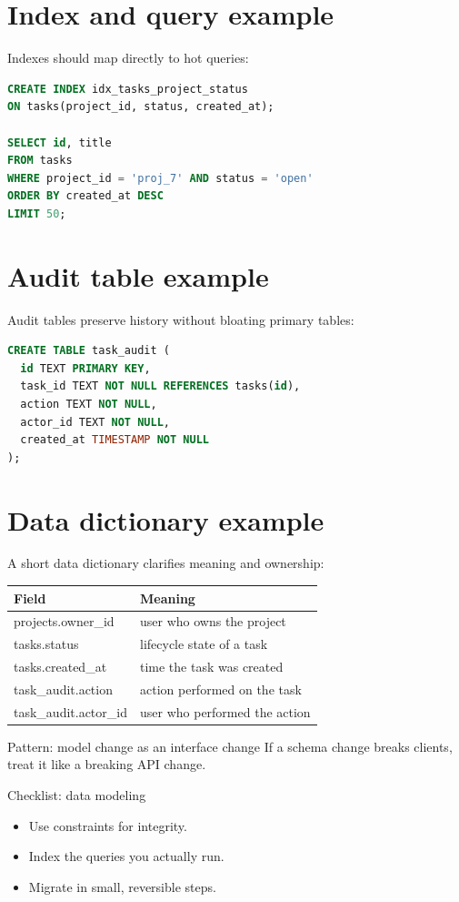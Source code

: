 \section{Index and query example}
Indexes should map directly to hot queries:
\begin{lstlisting}[language=SQL]
CREATE INDEX idx_tasks_project_status
ON tasks(project_id, status, created_at);

SELECT id, title
FROM tasks
WHERE project_id = 'proj_7' AND status = 'open'
ORDER BY created_at DESC
LIMIT 50;
\end{lstlisting}

\section{Audit table example}
Audit tables preserve history without bloating primary tables:
\begin{lstlisting}[language=SQL]
CREATE TABLE task_audit (
  id TEXT PRIMARY KEY,
  task_id TEXT NOT NULL REFERENCES tasks(id),
  action TEXT NOT NULL,
  actor_id TEXT NOT NULL,
  created_at TIMESTAMP NOT NULL
);
\end{lstlisting}

\section{Data dictionary example}
A short data dictionary clarifies meaning and ownership:

\begin{tabularx}{\textwidth}{@{}lX@{}}
\toprule
Field & Meaning \\
\midrule
projects.owner\_id & user who owns the project \\
tasks.status & lifecycle state of a task \\
tasks.created\_at & time the task was created \\
task\_audit.action & action performed on the task \\
task\_audit.actor\_id & user who performed the action \\
\bottomrule
\end{tabularx}

\begin{patternbox}{Pattern: model change as an interface change}
If a schema change breaks clients, treat it like a breaking API change.
\end{patternbox}

\begin{checklistbox}{Checklist: data modeling}
\begin{itemize}[nosep]
  \item Use constraints for integrity.
  \item Index the queries you actually run.
  \item Migrate in small, reversible steps.
\end{itemize}
\end{checklistbox}
